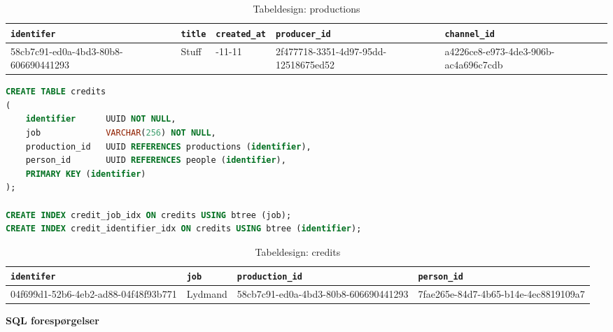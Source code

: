 \begin{table}[ht]
    \begin{tabularx}{\textwidth}{|>{\RaggedRight}X|>{\RaggedRight}X|>{\RaggedRight}X|>{\RaggedRight}X|>{\RaggedRight}X|}
        \hline
        \texttt{\textbf{identifer}} &  \texttt{\textbf{title}} & \texttt{\textbf{created\_at}} & \texttt{\textbf{producer\_id}} & \texttt{\textbf{channel\_id}}\\
        \hline
        58cb7c91-ed0a-4bd3-80b8-606690441293 & Stuff & 2008-11-11 & 2f477718-3351-4d97-95dd-12518675ed52 &  a4226ce8-e973-4de3-906b-ac4a696c7cdb\\
        \hline
    \end{tabularx}
    \caption{Tabeldesign: productions}
    \label{tab:productions_table}
\end{table}



\begin{lstlisting}[language=sql, caption=credits.sql]
CREATE TABLE credits
(
    identifier      UUID NOT NULL,
    job             VARCHAR(256) NOT NULL,
    production_id   UUID REFERENCES productions (identifier),
    person_id       UUID REFERENCES people (identifier),
    PRIMARY KEY (identifier)
);

CREATE INDEX credit_job_idx ON credits USING btree (job);
CREATE INDEX credit_identifier_idx ON credits USING btree (identifier);
\end{lstlisting}


\begin{table}[ht]
    \begin{tabularx}{\textwidth}{|>{\RaggedRight}X|>{\RaggedRight}X|>{\RaggedRight}X|>{\RaggedRight}X|}
        \hline
        \texttt{\textbf{identifer}} &  \texttt{\textbf{job}} & \texttt{\textbf{production\_id}} & \texttt{\textbf{person\_id}}\\
        \hline
        04f699d1-52b6-4eb2-ad88-04f48f93b771 & Lydmand & 58cb7c91-ed0a-4bd3-80b8-606690441293 & 7fae265e-84d7-4b65-b14e-4ec8819109a7\\
        \hline
    \end{tabularx}
    \caption{Tabeldesign: credits}
    \label{tab:credits_table}
\end{table}

{\large\textbf{SQL forespørgelser}}








